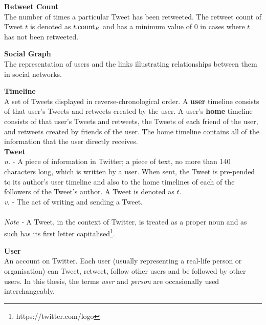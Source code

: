 {\bf Retweet Count}\\
The number of times a particular Tweet has been retweeted. The retweet count of Tweet $t$ is denoted as $t.\textrm{count}_R$ and has a minimum value of $0$ in cases where $t$ has not been retweeted.


{\bf Social Graph}\\
The representation of users and the links illustrating relationships between them in social networks.

{\bf Timeline}\\
A set of Tweets displayed in reverse-chronological order. A \textbf{user} timeline consists of that user's Tweets and retweets created by the user. A user's \textbf{home} timeline consists of that user's Tweets and retweets, the Tweets of each friend of the user, and retweets created by friends of the user. The home timeline contains all of the information that the user directly receives. \\

{\bf Tweet}\\
\textit{n.} - A piece of information in Twitter; a piece of text, no more than 140 characters long, which is written by a user. When sent, the Tweet is pre-pended to its author's user timeline and also to the home timelines of each of the followers of the Tweet's author. A Tweet is denoted as $t$.\\
\textit{v.} - The act of writing and sending a Tweet.\\ \\
\textit{Note -} A Tweet, in the context of Twitter, is treated as a proper noun and as such has its first letter capitalised\footnote{https://twitter.com/logo}.

{\bf User}\\
An account on Twitter. Each user (usually representing a real-life person or organisation) can Tweet, retweet, follow other users and be followed by other users. In this thesis, the terms \textit{user} and \textit{person} are occasionally used interchangeably.
